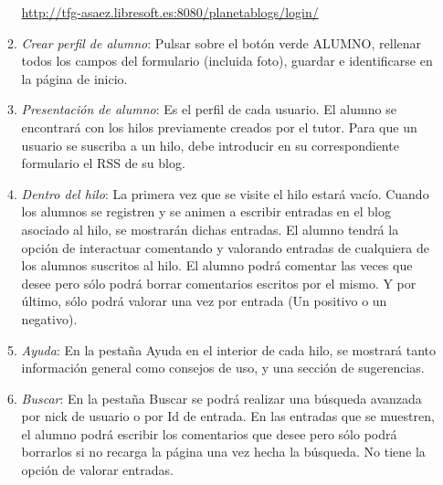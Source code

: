\documentclass[a4paper, 12pt]{book}
\begin{document}
\begin{itemize}
\begin{enumerate}
		\href{http://tfg-asaez.libresoft.es:8080/planetablogs/login/}{http://tfg-asaez.libresoft.es:8080/planetablogs/login/}
		\item \textit{Crear perfil de alumno}: Pulsar sobre el bot\'on verde ALUMNO, rellenar todos los campos del formulario (incluida foto), guardar e 
		identificarse en la p\'agina de inicio.
		\item \textit{Presentaci\'on de alumno}: Es el perfil de cada usuario. El alumno se encontrar\'a con los hilos previamente creados por el tutor. Para que 
		un usuario se suscriba a un hilo, debe introducir en su correspondiente formulario el RSS de su blog.
		\item \textit{Dentro del hilo}: La primera vez que se visite el hilo estar\'a vac\'io. Cuando los alumnos se registren y se animen a escribir entradas en 
		el blog asociado al hilo, se mostrar\'an dichas entradas. El alumno tendr\'a la opci\'on de interactuar comentando y valorando entradas de cualquiera de 
		los alumnos suscritos al hilo. El alumno podr\'a comentar las veces que desee pero s\'olo podr\'a borrar comentarios escritos por el mismo. Y por 
		\'ultimo, s\'olo podr\'a valorar una vez por entrada (Un positivo o un negativo).
		\item \textit{Ayuda}: En la pesta\~na Ayuda en el interior de cada hilo, se mostrar\'a tanto informaci\'on general como consejos de uso, y una secci\'on 
		de sugerencias.
		\item \textit{Buscar}: En la pesta\~na Buscar se podr\'a realizar una b\'usqueda avanzada por nick de usuario o por Id de entrada. En las entradas que 
		se muestren, el alumno podr\'a escribir los comentarios que desee pero s\'olo podr\'a borrarlos si no recarga la p\'agina una vez hecha la b\'usqueda. 
		No tiene la opci\'on de valorar entradas.
	\end{enumerate}
\end{itemize}
\end{document}
